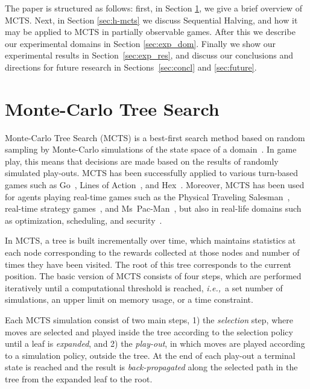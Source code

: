 \documentclass[a4paper]{llncs}
\newcommand{\ie}{{\it i.e.,}~}
\begin{document}
The paper is structured as follows: first, in Section \ref{sec:mcts}, we give a brief overview of MCTS. Next, in Section \ref{sec:h-mcts} we discuss Sequential Halving, and how it may be applied to MCTS in partially observable games. After this we describe our experimental domains in Section \ref{sec:exp_dom}. Finally we show our experimental results in Section~\ref{sec:exp_res}, and discuss our conclusions and directions for future research in Sections~\ref{sec:concl} and \ref{sec:future}.

\section{Monte-Carlo Tree Search}
\label{sec:mcts}

Monte-Carlo Tree Search (MCTS) is a best-first search method based on random sampling by Monte-Carlo simulations of the state space of a domain~\cite{coulom2007efficient,kocsis2006bandit}. In game play, this means that decisions are made based on the results of randomly simulated play-outs. MCTS has been successfully applied to various turn-based games such as Go~\cite{lee2010current}, Lines of Action~\cite{Winands2010b}, and Hex~\cite{arneson2010monte}. Moreover, MCTS has been used for agents playing real-time games such as the Physical Traveling Salesman~\cite{powleytsp}, real-time strategy games~\cite{balla2009uct}, and Ms~Pac-Man~\cite{realtime2014}, but also in real-life domains such as optimization, scheduling, and security~\cite{browne2012survey}.

In MCTS, a tree is built incrementally over time, which maintains statistics at each node corresponding to the rewards collected at those nodes and number of times they have been visited. The root of this tree corresponds to the current position. The basic version of MCTS consists of four steps, which are performed iteratively until a computational threshold is reached, \ie a set number of simulations, an upper limit on memory usage, or a time constraint. 

Each MCTS simulation consist of two main steps, 1) the \emph{selection} step, where moves are selected and played inside the tree according to the selection policy until a leaf is \emph{expanded}, and 2) the \emph{play-out}, in which moves are played according to a simulation policy, outside the tree. At the end of each play-out a terminal state is reached and the result is \emph{back-propagated} along the selected path in the tree from the expanded leaf to the root.
\end{document}
